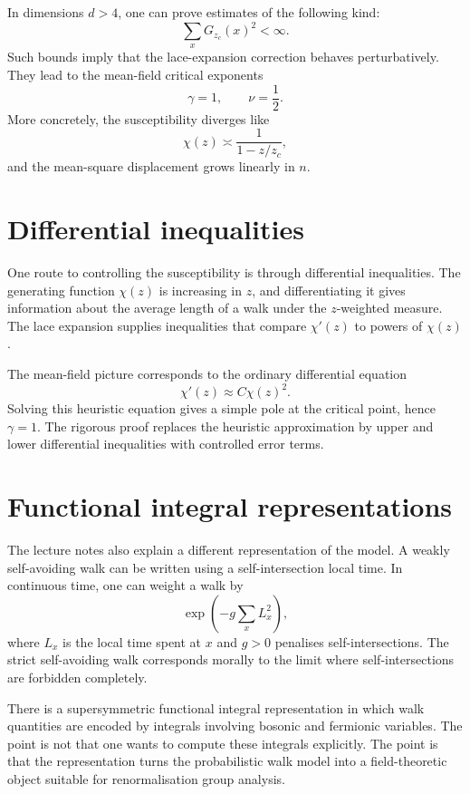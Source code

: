 In dimensions \(d>4\), one can prove estimates of the following kind:
\[
  \sum_x G_{z_c}(x)^2<\infty.
\]
Such bounds imply that the lace-expansion correction behaves perturbatively.  They lead to the mean-field critical exponents
\[
  \gamma=1,
  \qquad
  \nu=\frac12.
\]
More concretely, the susceptibility diverges like
\[
  \chi(z)\asymp \frac{1}{1-z/z_c},
\]
and the mean-square displacement grows linearly in \(n\).

\section{Differential inequalities}

One route to controlling the susceptibility is through differential inequalities.  The generating function \(\chi(z)\) is increasing in \(z\), and differentiating it gives information about the average length of a walk under the \(z\)-weighted measure.  The lace expansion supplies inequalities that compare \(\chi'(z)\) to powers of \(\chi(z)\).

The mean-field picture corresponds to the ordinary differential equation
\[
  \chi'(z)\approx C\chi(z)^2.
\]
Solving this heuristic equation gives a simple pole at the critical point, hence \(\gamma=1\).  The rigorous proof replaces the heuristic approximation by upper and lower differential inequalities with controlled error terms.

\section{Functional integral representations}

The lecture notes also explain a different representation of the model.  A weakly self-avoiding walk can be written using a self-intersection local time.  In continuous time, one can weight a walk by
\[
  \exp\left(-g\sum_x L_x^2\right),
\]
where \(L_x\) is the local time spent at \(x\) and \(g>0\) penalises self-intersections.  The strict self-avoiding walk corresponds morally to the limit where self-intersections are forbidden completely.

There is a supersymmetric functional integral representation in which walk quantities are encoded by integrals involving bosonic and fermionic variables.  The point is not that one wants to compute these integrals explicitly.  The point is that the representation turns the probabilistic walk model into a field-theoretic object suitable for renormalisation group analysis.


